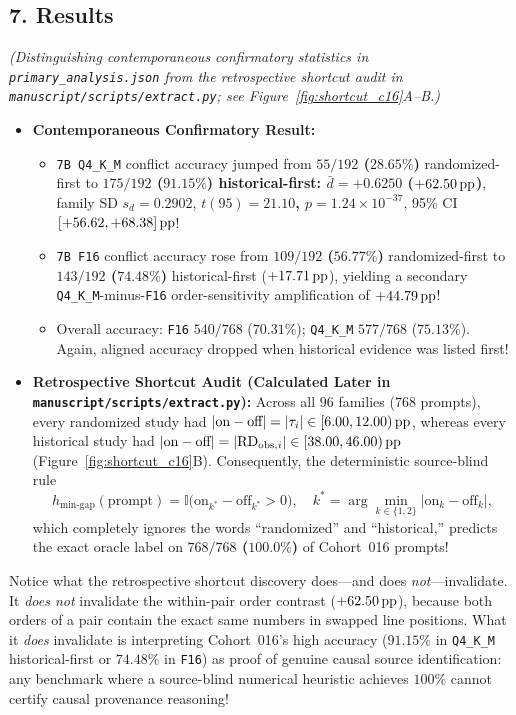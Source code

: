 \subsection*{7. Results}
\emph{(Distinguishing contemporaneous confirmatory statistics in \texttt{primary\_analysis.json} from the retrospective shortcut audit in \texttt{manuscript/scripts/extract.py}; see Figure~\ref{fig:shortcut_c16}A--B.)}
\begin{itemize}
  \item \textbf{Contemporaneous Confirmatory Result:}
    \begin{itemize}
      \item \texttt{7B Q4\_K\_M} conflict accuracy jumped from \textbf{$55/192$ ($28.65\%$)} randomized-first to \textbf{$175/192$ ($91.15\%$)\textbf{ historical-first: }$\bar{d} = +0.6250$ ($+62.50\,\mathrm{pp}$)}, family SD $s_d = 0.2902$, \textbf{$t(95) = 21.10$, $p = 1.24 \times 10^{-37}$}, 95\% CI $[+56.62, +68.38]\,\mathrm{pp}$!
      \item \texttt{7B F16} conflict accuracy rose from \textbf{$109/192$ ($56.77\%$)} randomized-first to \textbf{$143/192$ ($74.48\%$)} historical-first ($+17.71\,\mathrm{pp}$), yielding a secondary \texttt{Q4\_K\_M}-minus-\texttt{F16} order-sensitivity amplification of \textbf{$+44.79\,\mathrm{pp}$}!
      \item Overall accuracy: \texttt{F16} $540/768$ ($70.31\%$); \texttt{Q4\_K\_M} $577/768$ ($75.13\%$). Again, aligned accuracy dropped when historical evidence was listed first!
    \end{itemize}
  \item \textbf{Retrospective Shortcut Audit (Calculated Later in \texttt{manuscript/scripts/extract.py}):} Across all $96$ families ($768$ prompts), every randomized study had $|\text{on}-\text{off}| = |\tau_i| \in [6.00, 12.00)\,\mathrm{pp}$, whereas every historical study had $|\text{on}-\text{off}| = |\mathrm{RD}_{\mathrm{obs},i}| \in [38.00, 46.00)\,\mathrm{pp}$ (Figure~\ref{fig:shortcut_c16}B). Consequently, the deterministic source-blind rule
  \begin{equation}
    h_{\mathrm{min\text{-}gap}}(\text{prompt}) = \mathbb{I}\bigl(\text{on}_{k^*} - \text{off}_{k^*} > 0\bigr), \quad k^* = \arg\min_{k \in \{1,2\}} |\text{on}_k - \text{off}_k|,
  \end{equation}
  which completely ignores the words ``randomized'' and ``historical,'' predicts the exact oracle label on \textbf{$768/768$ ($100.0\%$)} of Cohort~016 prompts!
\end{itemize}

\begin{auditcallout}
Notice what the retrospective shortcut discovery does---and does \emph{not}---invalidate. It \emph{does not} invalidate the within-pair order contrast ($+62.50\,\mathrm{pp}$), because both orders of a pair contain the exact same numbers in swapped line positions. What it \emph{does} invalidate is interpreting Cohort~016's high accuracy ($91.15\%$ in \texttt{Q4\_K\_M} historical-first or $74.48\%$ in \texttt{F16}) as proof of genuine causal source identification: any benchmark where a source-blind numerical heuristic achieves $100\%$ cannot certify causal provenance reasoning!
\end{auditcallout}

